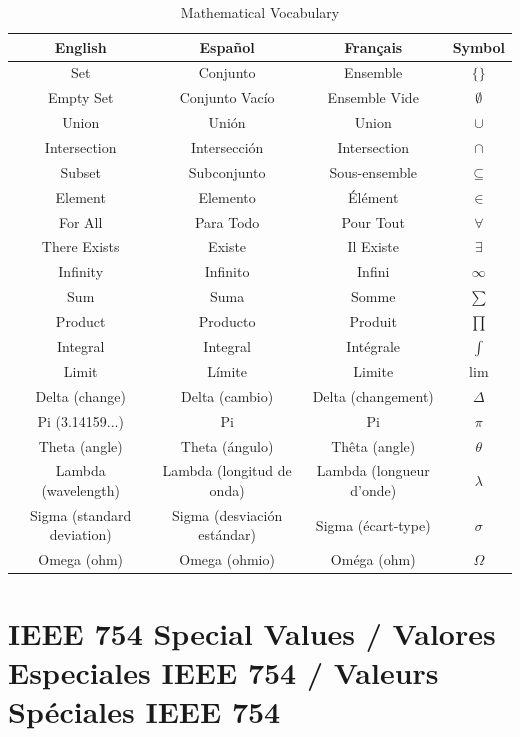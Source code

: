 \documentclass[12pt]{article}
\begin{document}
\begin{table}[h]
\centering
\begin{tabular}{|c|c|c|c|}
\hline
\textbf{English} & \textbf{Español} & \textbf{Français} & \textbf{Symbol} \\
\hline
Set & Conjunto & Ensemble & $\{ \}$ \\
\hline
Empty Set & Conjunto Vacío & Ensemble Vide & $\emptyset$ \\
\hline
Union & Unión & Union & $\cup$ \\
\hline
Intersection & Intersección & Intersection & $\cap$ \\
\hline
Subset & Subconjunto & Sous-ensemble & $\subseteq$ \\
\hline
Element & Elemento & Élément & $\in$ \\
\hline
For All & Para Todo & Pour Tout & $\forall$ \\
\hline
There Exists & Existe & Il Existe & $\exists$ \\
\hline
Infinity & Infinito & Infini & $\infty$ \\
\hline
Sum & Suma & Somme & $\sum$ \\
\hline
Product & Producto & Produit & $\prod$ \\
\hline
Integral & Integral & Intégrale & $\int$ \\
\hline
Limit & Límite & Limite & $\lim$ \\
\hline
Delta (change) & Delta (cambio) & Delta (changement) & $\Delta$ \\
\hline
Pi (3.14159...) & Pi & Pi & $\pi$ \\
\hline
Theta (angle) & Theta (ángulo) & Thêta (angle) & $\theta$ \\
\hline
Lambda (wavelength) & Lambda (longitud de onda) & Lambda (longueur d'onde) & $\lambda$ \\
\hline
Sigma (standard deviation) & Sigma (desviación estándar) & Sigma (écart-type) & $\sigma$ \\
\hline
Omega (ohm) & Omega (ohmio) & Oméga (ohm) & $\Omega$ \\
\hline
\end{tabular}
\caption{Mathematical Vocabulary}
\end{table}

\section{IEEE 754 Special Values / Valores Especiales IEEE 754 / Valeurs Spéciales IEEE 754}
\end{document}
